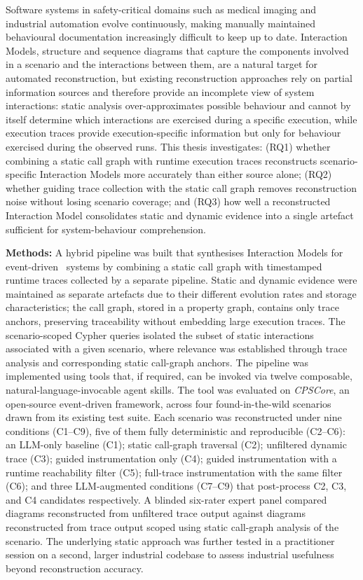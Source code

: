 Software systems in safety-critical domains such as medical imaging and
industrial automation evolve continuously, making manually maintained
behavioural documentation increasingly difficult to keep up to date.
\sysml Interaction Models, structure and sequence diagrams that capture
the components involved in a scenario and the interactions between them,
are a natural target for automated reconstruction, but existing
reconstruction approaches rely on partial information sources and
therefore provide an incomplete view of system interactions: static
analysis over-approximates possible behaviour and cannot by itself
determine which interactions are exercised during a specific execution,
while execution traces provide execution-specific information but only
for behaviour exercised during the observed runs. This thesis
investigates: (RQ1) whether combining a static call graph with runtime
execution traces reconstructs scenario-specific Interaction Models more
accurately than either source alone; (RQ2) whether guiding trace
collection with the static call graph removes reconstruction noise
without losing scenario coverage; and (RQ3) how well a reconstructed
\sysml Interaction Model consolidates static and dynamic evidence into a
single artefact sufficient for system-behaviour comprehension.

\textbf{Methods:} A hybrid pipeline was built that synthesises Interaction
Models for event-driven \Cpp\ systems by combining a static call graph
with timestamped runtime traces collected by a separate pipeline. Static
and dynamic evidence were maintained as separate artefacts due to their
different evolution rates and storage characteristics; the call graph,
stored in a \neo property graph, contains only trace anchors, preserving
traceability without embedding large execution traces. The scenario-scoped
Cypher queries isolated the subset of static interactions associated with
a given scenario, where relevance was established through trace analysis
and corresponding static call-graph anchors. The pipeline was implemented using tools that, if required, can be invoked via twelve composable, natural-language-invocable agent skills. The tool was evaluated on \emph{CPSCore}, an open-source event-driven framework, across
four found-in-the-wild scenarios drawn from its existing test suite. Each
scenario was reconstructed under nine conditions (C1--C9), five of them
fully deterministic and reproducible (C2--C6): an \ac{LLM}-only baseline
(C1); static call-graph traversal (C2); unfiltered dynamic trace (C3);
guided instrumentation only (C4); guided instrumentation with a runtime
reachability filter (C5); full-trace instrumentation with the same filter
(C6); and three \ac{LLM}-augmented conditions (C7--C9) that post-process
C2, C3, and C4 candidates respectively. A
blinded six-rater expert panel compared diagrams reconstructed from
unfiltered trace output against diagrams reconstructed from trace output
scoped using static call-graph analysis of the scenario. The underlying
static approach was further tested in a practitioner session on a second,
larger industrial codebase to assess industrial usefulness beyond
reconstruction accuracy.

